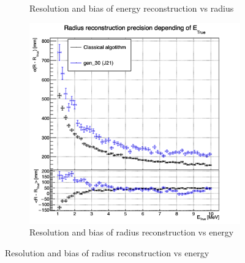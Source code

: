 \begin{figure}[ht]
\begin{subfigure}[t]{0.32\linewidth}
    \caption{Resolution and bias of energy reconstruction vs radius}
    \label{fig:jcnn:vic_cnn:multi_vic_cnn_MESBvRTC}
  \end{subfigure}
  \begin{subfigure}[t]{0.32\linewidth}
    \centering
    \includegraphics[width=\linewidth]{images/jcnn/vic_cnn/multi_vic_cnn_MSBvETC.png}
    \caption{Resolution and bias of radius reconstruction vs energy}
    \label{fig:jcnn:vic_cnn:multi_vic_cnn_MSBvETC}
  \end{subfigure}



\end{figure}
